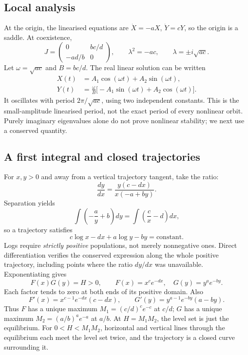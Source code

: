 \subsection{Local analysis}
At the origin, the linearised equations are $\dot X=-aX$, $\dot Y=cY$,
so the origin is a saddle.
At coexistence,
\[
J=\begin{pmatrix}0&bc/d\\-ad/b&0\end{pmatrix},\qquad
\lambda^2=-ac,\qquad\lambda=\pm i\sqrt{ac}.
\]
Let $\omega=\sqrt{ac}$ and $B=bc/d$. The real linear solution can be written
\begin{align*}
X(t)&=A_1\cos(\omega t)+A_2\sin(\omega t),\\
Y(t)&=\frac\omega B\bigl[-A_1\sin(\omega t)+A_2\cos(\omega t)\bigr].
\end{align*}
It oscillates with period $2\pi/\sqrt{ac}$, using two independent constants.
This is the small-amplitude linearised period, not the exact period of
every nonlinear orbit. Purely imaginary eigenvalues alone do not prove
nonlinear stability; we next use a conserved quantity.

\subsection{A first integral and closed trajectories}
For $x,y>0$ and away from a vertical trajectory tangent, take the ratio:
\[
\frac{dy}{dx}=\frac{y(c-dx)}{x(-a+by)}.
\]
Separation yields
\[
\int\left(-\frac ay+b\right)dy
=\int\left(\frac cx-d\right)dx,
\]
so a trajectory satisfies
\begin{equation}\label{eq:applied-lv-integral}
c\log x-dx+a\log y-by=\text{constant}.
\end{equation}
Logs require \emph{strictly positive} populations, not merely nonnegative ones.
Direct differentiation verifies the conserved expression along the whole
positive trajectory, including points where the ratio $dy/dx$ was unavailable.
Exponentiating gives
\[
F(x)G(y)=H>0,\qquad F(x)=x^ce^{-dx},\quad G(y)=y^ae^{-by}.
\]
Each factor tends to zero at both ends of its positive domain. Also
\[
F'(x)=x^{c-1}e^{-dx}(c-dx),\qquad
G'(y)=y^{a-1}e^{-by}(a-by).
\]
Thus $F$ has a unique maximum $M_1=(c/d)^ce^{-c}$ at $c/d$;
$G$ has a unique maximum $M_2=(a/b)^ae^{-a}$ at $a/b$.
At $H=M_1M_2$, the level set is just the equilibrium. For
$0<H<M_1M_2$, horizontal and vertical lines through the equilibrium each
meet the level set twice, and the trajectory is a closed curve surrounding it.

